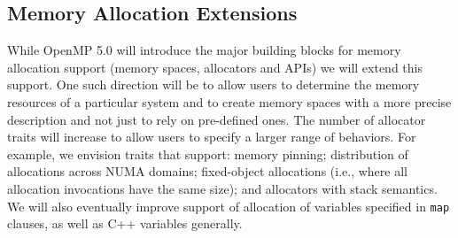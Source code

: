 \subsection{Memory Allocation Extensions}

While OpenMP 5.0 will introduce the major building blocks for memory 
allocation support (memory spaces, allocators and APIs) we will extend 
this support. One such direction will be to allow users to determine
the memory resources of a particular system and to create memory spaces with 
a more precise description and not just to rely on pre-defined ones. The 
number of allocator traits will increase to allow users to specify a larger 
range of behaviors. For example, we envision traits that support: memory
pinning; distribution of allocations across NUMA domains; fixed-object 
allocations (i.e., where all allocation invocations have the same size);
and allocators with stack semantics. We will also eventually improve
support of allocation of variables specified in \texttt{map} clauses, as
well as C++ variables generally. 

 
